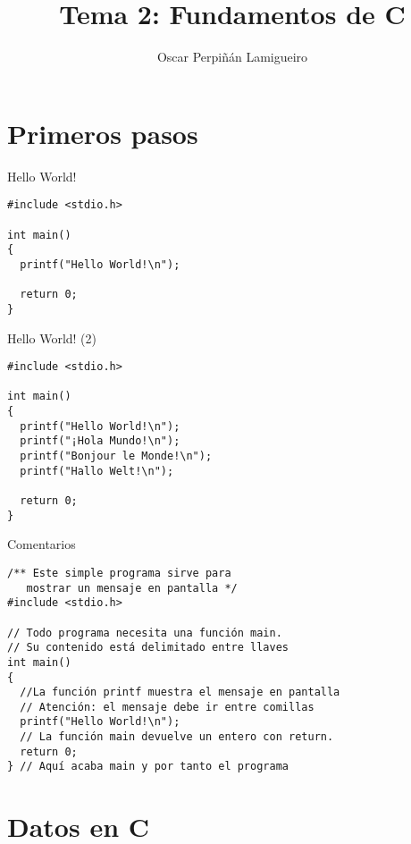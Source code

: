 \documentclass[xcolor={usenames,svgnames,dvipsnames}, aspectratio=169]{beamer}
\author{Oscar Perpiñán Lamigueiro}
\date{}
\title{Tema 2: Fundamentos de C}
\begin{document}
\maketitle


\section{Primeros pasos}
\label{sec:org605fe6a}
\begin{frame}[label={sec:orga7b8398},fragile]{Hello World!}
 \lstset{language=C,label= ,caption= ,captionpos=b,numbers=none}
\begin{lstlisting}
#include <stdio.h>

int main()
{
  printf("Hello World!\n");

  return 0;
}
\end{lstlisting}
\end{frame}

\begin{frame}[label={sec:org255a37d},fragile]{Hello World! (2)}
 \lstset{language=C,label= ,caption= ,captionpos=b,numbers=none}
\begin{lstlisting}
#include <stdio.h>

int main()
{
  printf("Hello World!\n");
  printf("¡Hola Mundo!\n");
  printf("Bonjour le Monde!\n");
  printf("Hallo Welt!\n");

  return 0;
}
\end{lstlisting}
\end{frame}

\begin{frame}[label={sec:org19f6e3d},fragile]{Comentarios}
 \lstset{language=C,label= ,caption= ,captionpos=b,numbers=none}
\begin{lstlisting}
/** Este simple programa sirve para 
   mostrar un mensaje en pantalla */
#include <stdio.h>

// Todo programa necesita una función main.
// Su contenido está delimitado entre llaves
int main()
{
  //La función printf muestra el mensaje en pantalla
  // Atención: el mensaje debe ir entre comillas
  printf("Hello World!\n");
  // La función main devuelve un entero con return.
  return 0;
} // Aquí acaba main y por tanto el programa
\end{lstlisting}
\end{frame}

\section{Datos en C}
\label{sec:org90234b6}
\end{document}
